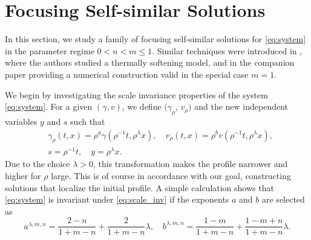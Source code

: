 \documentclass[a4paper,11pt]{article}
\numberwithin{step}{dummy}
\begin{document}
\section{Focusing Self-similar Solutions} \label{sec:fss}
In this section, we study a family of focusing self-similar solutions for \eqref{eq:system} in the parameter regime $0 < n < m \le 1$.
Similar techniques were introduced in \cite{katsaounis_emergence_2014}, where the authors studied a thermally softening model,
and in the companion paper \cite{KLT_2016} providing a numerical construction valid in the special case $m=1$.

We begin by investigating the scale invariance properties of the system \eqref{eq:system}. For a given $(\gamma,v)$, we define $(\gamma_\rho$, $v_\rho)$ and the new independent variables $y$ and $s$ such that
\begin{equation} \label{eq:scale_inv}
\begin{aligned}
 &\gamma_\rho(t,x) = \rho^a \gamma(\rho^{-1}t, \rho^\lambda x), \quad
 v_\rho(t,x) = \rho^b v(\rho^{-1}t, \rho^\lambda x),\\
 &s=\rho^{-1}t, \quad
 y=\rho^ \lambda x.
\end{aligned}
\end{equation}
Due to the choice $\lambda>0$, this transformation makes the profile narrower and higher for $\rho$ large. This is of course in accordance with our goal, constructing solutions that localize the initial profile. A simple calculation shows that \eqref{eq:system} is invariant under \eqref{eq:scale_inv} if the exponents $a$ and $b$ are selected as 
\begin{equation} \label{eq:s_inv}
 a^{\lambda,m,n}= \frac{2-n}{1+m-n} + \frac{2}{1+m-n}\lambda, \quad b^{\lambda,m,n}= \frac{1-m}{1+m-n} + \frac{1-m+n}{1+m-n} \lambda.
\end{equation}
\end{document}
